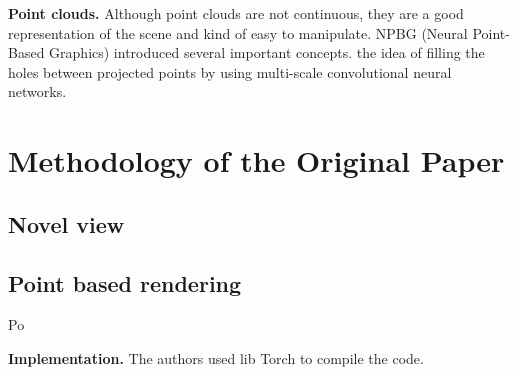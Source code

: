 \noindent\textbf{Point clouds.} Although point clouds are not continuous, they are a good representation of the scene and kind of easy to manipulate. NPBG \cite{Aliev2020} (Neural Point-Based Graphics) introduced several important concepts. the idea of filling the holes between projected points by using multi-scale convolutional neural networks.  




\section{Methodology of the Original Paper}
\label{sec:methodo_paper}
\subsection{Novel view}
\label{subsec:Projecting points}

\subsection{Point based rendering}
\label{subsec:Projecting points}
Po


\noindent\textbf{Implementation.} The authors used lib Torch to compile the code. 

